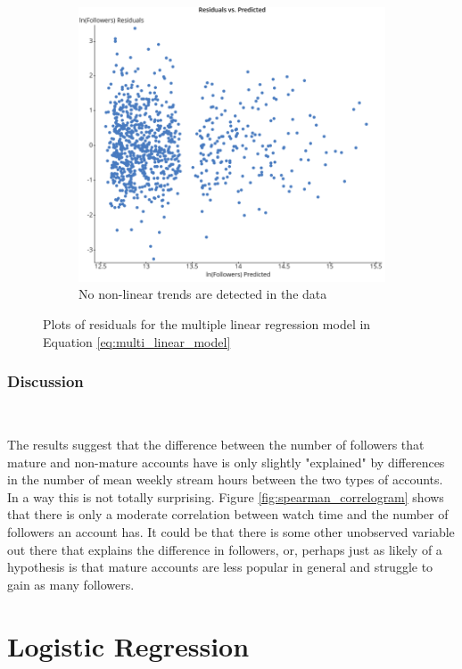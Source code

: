 \documentclass[12pt]{article}
\begin{document}
\begin{figure}
\begin{subfigure}{0.45\textwidth}
        \includegraphics[width=\textwidth]{../StatCrunch_Results/followers_mature_watch_hrs/residual_plot}
        \caption{No non-linear trends are detected in the data}
        \label{fig:plot2}
    \end{subfigure}
    \caption{Plots of residuals for the multiple linear regression model in Equation \ref{eq:multi_linear_model}}
    \label{fig:both_plots}
\end{figure}

\subsubsection{Discussion}\

The results suggest that the difference between the number of followers that mature and non-mature accounts have is only slightly "explained" by differences in the number of mean weekly stream hours between the two types of accounts. In a way this is not totally surprising. Figure \ref{fig:spearman_correlogram} shows that there is only a moderate correlation between watch time and the number of followers an account has. It could be that there is some other unobserved variable out there that explains the difference in followers, or, perhaps just as likely of a hypothesis is that mature accounts are less popular in general and struggle to gain as many followers.

\section{Logistic Regression}
\end{document}
